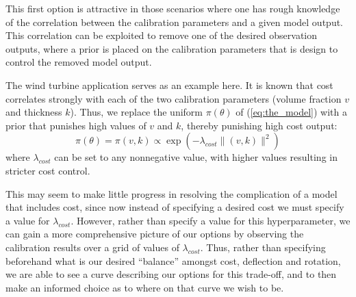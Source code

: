 \documentclass{article}
\begin{document}

This first option is attractive in those scenarios where one has rough knowledge of the correlation between the calibration parameters and a given model output. This correlation can be exploited to remove one of the desired observation outputs, where a prior is placed on the calibration parameters that is design to control the removed model output.

The wind turbine application serves as an example here. It is known that cost correlates strongly with each of the two calibration parameters (volume fraction $v$ and thickness $k$). Thus, we replace the uniform $\pi(\theta)$ of (\ref{eq:the_model}) with a prior that punishes high values of $v$ and $k$, thereby punishing high cost output:
\begin{equation}\label{eq:theta_prior}
\pi(\theta)=\pi(v,k)\propto \exp(-\lambda_{cost}\lVert (v,k)\rVert ^2)
\end{equation}
where $\lambda_{cost}$ can be set to any nonnegative value, with higher values resulting in stricter cost control.

This may seem to make little progress in resolving the complication of a model that includes cost, since now instead of specifying a desired cost we must specify a value for $\lambda_{cost}$. However, rather than specify a value for this hyperparameter, we can gain a more comprehensive picture of our options by observing the calibration results over a grid of values of $\lambda_{cost}$. Thus, rather than specifying beforehand what is our desired ``balance'' amongst cost, deflection and rotation, we are able to see a curve describing our options for this trade-off, and to then make an informed choice as to where on that curve we wish to be. 
\end{document}
